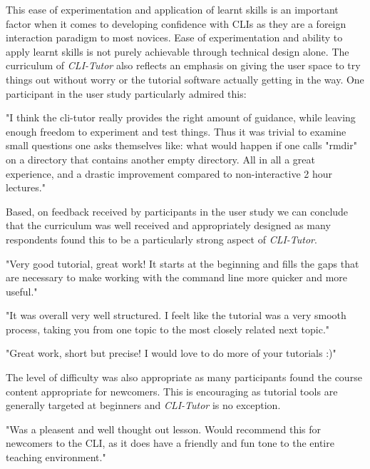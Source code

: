 This ease of experimentation and application of learnt skills is an
important factor when it comes to developing confidence with CLIs as they are a
foreign interaction paradigm to most novices. Ease of experimentation and
ability to apply learnt skills is not purely achievable through technical
design alone. The curriculum of \textit{CLI-Tutor} also reflects an emphasis on
giving the user space to try things out without worry or the tutorial software
actually getting in the way. One participant in the user study particularly
admired this: 

\begin{quotes}
    "I think the cli-tutor really provides the right amount of guidance, while
    leaving enough freedom to experiment and test things. Thus it was trivial to
    examine small questions one asks themselves like:  what would happen if one
    calls "rmdir" on a directory that contains another empty directory.  All in all
    a great experience, and a drastic improvement compared to non-interactive  2
    hour lectures."
\end{quotes}

Based, on feedback received by participants in the user study we can conclude
that the curriculum was well received and appropriately designed as many
respondents found this to be a particularly strong aspect of
\textit{CLI-Tutor}. 

\begin{quotes}
    "Very good tutorial, great work! It starts at the beginning and fills the gaps
    that are necessary to make working with the command line more quicker and more
    useful."
\end{quotes}

\begin{quotes}
    "It was overall very well structured. I feelt like the tutorial was a very
    smooth process, taking you from one topic to the most closely related next
    topic."
\end{quotes}

\begin{quotes}
"Great work, short but precise! I would love to do more of your tutorials :)"
\end{quotes}

The level of difficulty was also appropriate as many participants found the
course content appropriate for newcomers. This is encouraging as tutorial tools
are generally targeted at beginners and \textit{CLI-Tutor} is no exception. 

\begin{quotes}
    "Was a pleasent and well thought out lesson. Would recommend this for newcomers
    to the CLI, as it does have a friendly and fun tone to the entire teaching
    environment."
\end{quotes}

